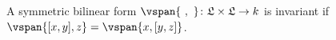 A symmetric bilinear form $\vspan{\ ,\ }\colon \mathfrak{L}\times \mathfrak{L}\to k$ is
invariant if $\vspan{[x, y], z} = \vspan{x, [y, z]}$.
